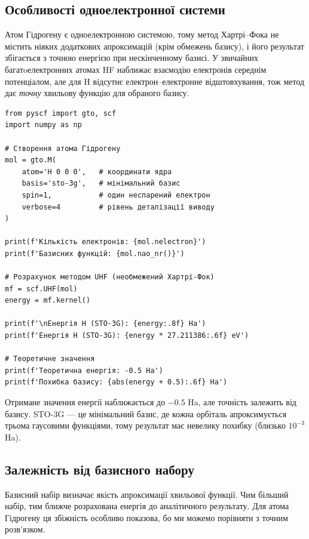 \subsection{Особливості одноелектронної системи}

Атом Гідрогену є одноелектронною системою, тому метод Хартрі–Фока не містить ніяких додаткових апроксимацій (крім обмежень базису), і його результат збігається з точною енергією при нескінченному
базисі.
У звичайних багатoелектронних атомах HF наближає взаємодію електронів середнім потенціалом, але для H відсутнє електрон–електронне відштовхування, тож метод дає \emph{точну} хвильову функцію для обраного базису.

\begin{verbatim}
from pyscf import gto, scf
import numpy as np

# Створення атома Гідрогену
mol = gto.M(
    atom='H 0 0 0',   # координати ядра
    basis='sto-3g',   # мінімальний базис
    spin=1,           # один неспарений електрон
    verbose=4         # рівень деталізації виводу
)

print(f'Кількість електронів: {mol.nelectron}')
print(f'Базисних функцій: {mol.nao_nr()}')

# Розрахунок методом UHF (необмежений Хартрі-Фок)
mf = scf.UHF(mol)
energy = mf.kernel()

print(f'\nЕнергія H (STO-3G): {energy:.8f} Ha')
print(f'Енергія H (STO-3G): {energy * 27.211386:.6f} eV')

# Теоретичне значення
print(f'Теоретична енергія: -0.5 Ha')
print(f'Похибка базису: {abs(energy + 0.5):.6f} Ha')
\end{verbatim}

Отримане значення енергії наближається до \(-0.5\) Ha, але точність залежить від базису. STO-3G --- це мінімальний базис, де кожна орбіталь апроксимується трьома гаусовими функціями, тому результат має невелику похибку (близько \(10^{-3}\) Ha).

\subsection{Залежність від базисного набору}

Базисний набір визначає якість апроксимації хвильової функції.
Чим більший набір, тим ближче розрахована енергія до аналітичного результату.
Для атома Гідрогену ця збіжність особливо показова, бо ми можемо порівняти з точним розв’язком.

